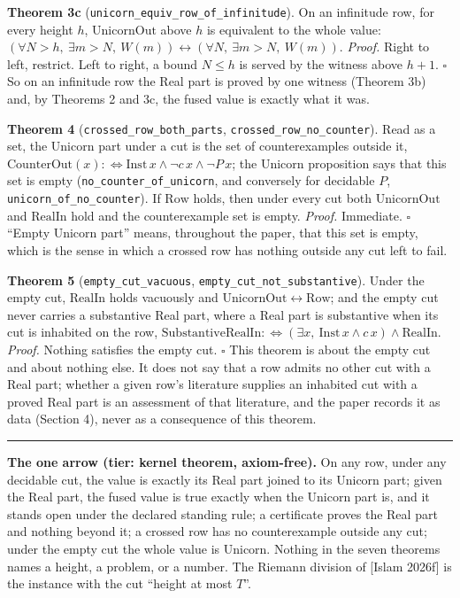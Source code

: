 \documentclass[10pt,twocolumn]{article}
\newenvironment{jbox}{\par\vspace{2pt}\noindent\color{accent}\rule{\columnwidth}{0.8pt}\par\vspace{-2pt}\small}{\par\vspace{2pt}}
\begin{document}
\textbf{Theorem 3c} (\texttt{unicorn\_equiv\_row\_of\_infinitude}). On
an infinitude row, for every height \(h\), \(\mathrm{UnicornOut}\) above
\(h\) is equivalent to the whole value:
\((\forall N > h,\ \exists m > N,\ W(m)) \leftrightarrow (\forall N,\ \exists m > N,\ W(m))\).
\emph{Proof.} Right to left, restrict. Left to right, a bound
\(N \le h\) is served by the witness above \(h + 1\). \(\square\) So on
an infinitude row the Real part is proved by one witness (Theorem 3b)
and, by Theorems 2 and 3c, the fused value is exactly what it was.

\textbf{Theorem 4} (\texttt{crossed\_row\_both\_parts},
\texttt{crossed\_row\_no\_counter}). Read as a set, the Unicorn part
under a cut is the set of counterexamples outside it,
\(\mathrm{CounterOut}(x) :\Leftrightarrow \mathrm{Inst}\,x \wedge \neg c\,x \wedge \neg P\,x\);
the Unicorn proposition says that this set is empty
(\texttt{no\_counter\_of\_unicorn}, and conversely for decidable \(P\),
\texttt{unicorn\_of\_no\_counter}). If \(\mathrm{Row}\) holds, then
under every cut both \(\mathrm{UnicornOut}\) and \(\mathrm{RealIn}\)
hold and the counterexample set is empty. \emph{Proof.} Immediate.
\(\square\) ``Empty Unicorn part'' means, throughout the paper, that
this set is empty, which is the sense in which a crossed row has nothing
outside any cut left to fail.

\textbf{Theorem 5} (\texttt{empty\_cut\_vacuous},
\texttt{empty\_cut\_not\_substantive}). Under the empty cut,
\(\mathrm{RealIn}\) holds vacuously and
\(\mathrm{UnicornOut} \leftrightarrow \mathrm{Row}\); and the empty cut
never carries a substantive Real part, where a Real part is substantive
when its cut is inhabited on the row,
\(\mathrm{SubstantiveRealIn} :\Leftrightarrow (\exists x,\ \mathrm{Inst}\,x \wedge c\,x) \wedge \mathrm{RealIn}\).
\emph{Proof.} Nothing satisfies the empty cut. \(\square\) This theorem
is about the empty cut and about nothing else. It does not say that a
row admits no other cut with a Real part; whether a given row's
literature supplies an inhabited cut with a proved Real part is an
assessment of that literature, and the paper records it as data (Section
4), never as a consequence of this theorem.

\begin{jbox}
\textbf{The one arrow (tier: kernel theorem, axiom-free).} On any row, under any decidable cut, the value is exactly its Real part joined to its Unicorn part; given the Real part, the fused value is true exactly when the Unicorn part is, and it stands open under the declared standing rule; a certificate proves the Real part and nothing beyond it; a crossed row has no counterexample outside any cut; under the empty cut the whole value is Unicorn. Nothing in the seven theorems names a height, a problem, or a number. The Riemann division of [Islam 2026f] is the instance with the cut ``height at most $T$''.
\end{jbox}
\end{document}

